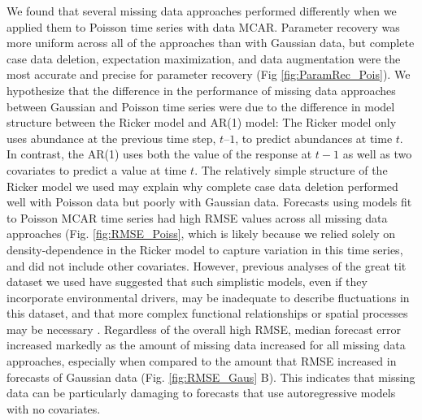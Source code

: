 \documentclass{article}
\begin{document}
 We found that several missing data approaches performed differently when we applied them to Poisson time series with data MCAR. Parameter recovery was more uniform across all of the approaches than with Gaussian data, but complete case data deletion, expectation maximization, and data augmentation were the most accurate and precise for parameter recovery (Fig \ref{fig:ParamRec_Pois}). %
We hypothesize that the difference in the performance of missing data approaches between Gaussian and Poisson time series were due to the difference in model structure between the Ricker model and AR(1) model: The Ricker model only uses abundance at the previous time step,  $t – 1$, to predict abundances at time $t$. In contrast, the AR(1) uses both the value of the response at $t-1$ as well as two covariates to predict a value at time $t$. The relatively simple structure of the Ricker model we used may explain why complete case data deletion performed well with Poisson data but poorly with Gaussian data. %
Forecasts using models fit to Poisson MCAR time series had high RMSE values across all missing data approaches (Fig. \ref{fig:RMSE_Poiss}, which is likely because we relied solely on density-dependence in the Ricker model to capture variation in this time series, and did not include other covariates. However, previous analyses of the great tit dataset we used have suggested that such simplistic models, even if they incorporate environmental drivers, may be inadequate to describe fluctuations in this dataset, and that more complex functional relationships or spatial processes may be necessary \citep{lebreton1990modelling}. Regardless of the overall high RMSE, median forecast error increased markedly as the amount of missing data increased for all missing data approaches, especially when compared to the amount that RMSE increased in forecasts of Gaussian data (Fig. \ref{fig:RMSE_Gaus} B). This indicates that missing data can be particularly damaging to forecasts that use autoregressive models with no covariates. 
         
\end{document}
